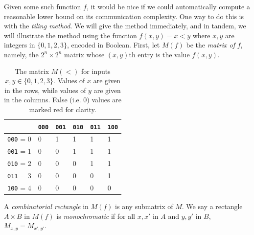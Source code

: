 \documentclass[12pt]{article}
\begin{document}
Given some such function $f$, it would be nice if we could automatically compute
a reasonable lower bound on its communication complexity.
One way to do this is with the \emph{tiling method}.
We will give the method immediately, and in tandem, we will illustrate the method using
the function $f(x, y) = x < y$ where $x, y$ are integers in $\{ 0, 1, 2, 3 \}$, encoded in $\mathbb{B}$oolean.
First, let $M(f)$ be the \emph{matrix of }$f$,
	namely,
		the $2^n \times 2^n$ matrix whose $(x, y)$th entry
		is the value $f(x, y)$.

\begin{table}[h]
\centering
\begin{tabular}{|l|lllll|}
\hline
    & \texttt{000} & \texttt{001} & \texttt{010} & \texttt{011} & \texttt{100} \\\hline
\texttt{000} = 0   & \cellcolor{red!25}0 & \cellcolor{green!25}1 & \cellcolor{green!25}1 & \cellcolor{green!25}1 & \cellcolor{green!25}1 \\
\texttt{001} = 1   & \cellcolor{red!25}0 & \cellcolor{red!25}0 & \cellcolor{green!25}1 & \cellcolor{green!25}1 & \cellcolor{green!25}1 \\
\texttt{010} = 2   & \cellcolor{red!25}0 & \cellcolor{red!25}0 & \cellcolor{red!25}0 & \cellcolor{green!25}1 & \cellcolor{green!25}1 \\
\texttt{011} = 3   & \cellcolor{red!25}0 & \cellcolor{red!25}0 & \cellcolor{red!25}0 & \cellcolor{red!25}0 & \cellcolor{green!25}1 \\
\texttt{100} = 4   & \cellcolor{red!25}0 & \cellcolor{red!25}0 & \cellcolor{red!25}0 & \cellcolor{red!25}0 & \cellcolor{red!25}0\\\hline
\end{tabular}
\caption{The matrix $M(<)$ for inputs $x, y \in \{ 0, 1, 2, 3 \}$.  Values of $x$ are given in the rows, while values of $y$ are given in the columns.  False (i.e. 0) values are marked red for clarity.}
\end{table}

A \emph{combinatorial rectangle} in $M(f)$ is any submatrix of $M$.
We say a rectangle $A \times B$ in $M(f)$ is \emph{monochromatic}
if for all $x, x'$ in $A$ and $y, y'$ in $B$, $M_{x,y} = M_{x',y'}$.
\end{document}
